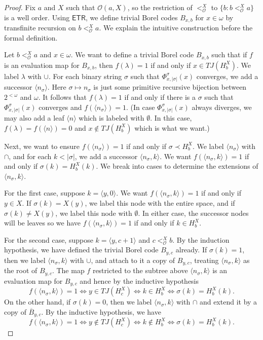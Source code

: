 \documentclass{amsart}
\theoremstyle{definition}
\theoremstyle{remark}
\begin{document}
\begin{proof}
Fix $a$ and $X$ such that $\mathcal{O}(a,X)$, so the restriction of $<_{\mathcal{O}}^X$ to $\{ b : b <_{\mathcal{O}}^X a \}$ is a well order. 
Using $\mathsf{ETR}$, we define trivial Borel codes $B_{x,b}$ for $x \in \omega$ by transfinite recursion on $b <_{\mathcal{O}}^X a$. We explain the intuitive construction 
before the formal definition. 

Let $b <_{\mathcal{O}}^X a$ and $x \in \omega$. We want to define a trivial Borel code $B_{x,b}$ such that if $f$ is an evaluation map for $B_{x,b}$, then 
$f(\lambda) = 1$ if and only if 
$x \in TJ(H_b^X)$. We label $\lambda$ with $\cup$. For each binary string 
$\sigma$ such that $\Phi_{x,|\sigma|}^{\sigma}(x)$ converges, we add a successor $\langle n_\sigma \rangle$.  Here $\sigma\mapsto n_\sigma$ is just some 
primitive recursive bijection between $2^{<\omega}$ and $\omega$.
It follows that $f(\lambda) =1$ if and only if there is a $\sigma$ such that $\Phi_{x,|\sigma|}^{\sigma}(x)$ converges and 
$f(\langle n_\sigma \rangle) = 1$. (In case $\Phi_{x,|\sigma|}^{\sigma}(x)$ always diverges, 
we may also add a leaf $\langle n \rangle$ which is labeled with $\emptyset$. In this case, $f(\lambda) = f(\langle n \rangle) = 0$ and $x \not \in TJ(H_b^X)$ which is what we want.)

Next, we want to ensure $f(\langle n_\sigma \rangle) = 1$ if and only if $\sigma \prec H_b^X$.  We label $\langle n_\sigma\rangle$ with $\cap$,
and for each $k < |\sigma|$, we add a 
successor $\langle n_\sigma, k \rangle$. 
We want $f(\langle n_\sigma, k \rangle) = 1$ if and only if $\sigma(k) = H_b^X(k)$. We 
break into cases to determine the extensions of $\langle n_\sigma, k \rangle$. 

For the first case, suppose $k = \langle y,0 \rangle$. We want $f(\langle n_\sigma, k \rangle) = 1$ if and only if $y \in X$. If $\sigma(k) = X(y)$, we label this node with 
the entire space, and if $\sigma(k) \neq X(y)$, we label this node with $\emptyset$. In either case, the successor nodes will be leaves so we have $f(\langle n_\sigma, k \rangle) = 1$ if and only 
if $k \in H_b^X$. 

For the second case, suppose $k = \langle y, c+1 \rangle$ and $c <_{\mathcal{O}}^X b$. By the induction hypothesis, we have defined the trivial Borel code $B_{y,c}$ already. If 
$\sigma(k) = 1$, then we label $\langle n_\sigma, k \rangle$
with $\cup$, and attach to it a copy of $B_{y,c}$, treating $\langle n_\sigma, k \rangle$ as the root of $B_{y,c}$. 
The map $f$ restricted to the subtree above $\langle n_\sigma, k \rangle$ is an evaluation map for $B_{y,c}$ and hence by the inductive hypothesis
\[
f(\langle n_\sigma, k \rangle) = 1 \Leftrightarrow y \in TJ(H_c^X) \Leftrightarrow k \in H_b^X \Leftrightarrow \sigma(k) = H_b^X(k).
\] 
On the other hand, if $\sigma(k) = 0$, then we label $\langle n_\sigma, k \rangle$
with $\cap$ and extend it by a copy of $\overline{B}_{y,c}$. By the inductive hypothesis, we have 
\[
f(\langle n_\sigma, k \rangle) = 1 \Leftrightarrow y \not \in TJ(H_c^X) \Leftrightarrow k \not \in H_b^X \Leftrightarrow \sigma(k) = H_b^X(k).
\]


\end{proof}
\end{document}
